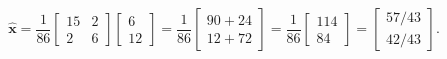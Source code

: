 \documentclass[11pt, letterpaper]{article}
\theoremstyle{definition}
\theoremstyle{remark}
\begin{document}
\[
\hat{\mathbf{x}} = \frac{1}{86} \begin{bmatrix} 15 & 2 \\ 2 & 6 \end{bmatrix} \begin{bmatrix} 6 \\ 12 \end{bmatrix} = \frac{1}{86} \begin{bmatrix} 90 + 24 \\ 12 + 72 \end{bmatrix} = \frac{1}{86} \begin{bmatrix} 114 \\ 84 \end{bmatrix} = \begin{bmatrix} 57/43 \\ 42/43 \end{bmatrix}.
\]
\end{document}
